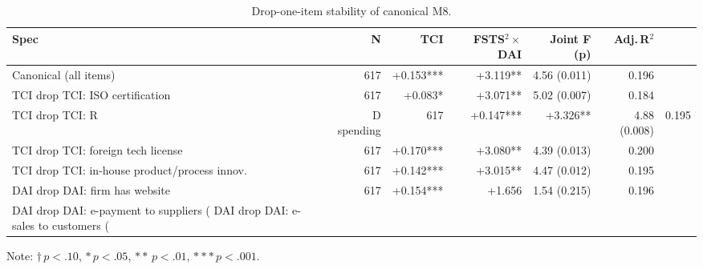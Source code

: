 \begin{table}[ht]
\centering
\caption{Drop-one-item stability of canonical M8.}
\label{tab:drop_one}
\begin{tabular}{lrrrrr}
\toprule
Spec & N & TCI & FSTS$^2\times$DAI & Joint F (p) & Adj.\,R$^2$ \\
\midrule
Canonical (all items) & 617 & +0.153*** & +3.119** & 4.56 (0.011) & 0.196 \\
TCI drop TCI: ISO certification & 617 & +0.083* & +3.071** & 5.02 (0.007) & 0.184 \\
TCI drop TCI: R&D spending & 617 & +0.147*** & +3.326** & 4.88 (0.008) & 0.195 \\
TCI drop TCI: foreign tech license & 617 & +0.170*** & +3.080** & 4.39 (0.013) & 0.200 \\
TCI drop TCI: in-house product/process innov. & 617 & +0.142*** & +3.015** & 4.47 (0.012) & 0.195 \\
DAI drop DAI: firm has website & 617 & +0.154*** & +1.656 & 1.54 (0.215) & 0.196 \\
DAI drop DAI: e-payment to suppliers (%
DAI drop DAI: e-sales to customers (%
\bottomrule
\end{tabular}
\par\smallskip
\footnotesize Note: $\dagger\,p<.10$, $*\,p<.05$, $**\,p<.01$, $***\,p<.001$.
\end{table}